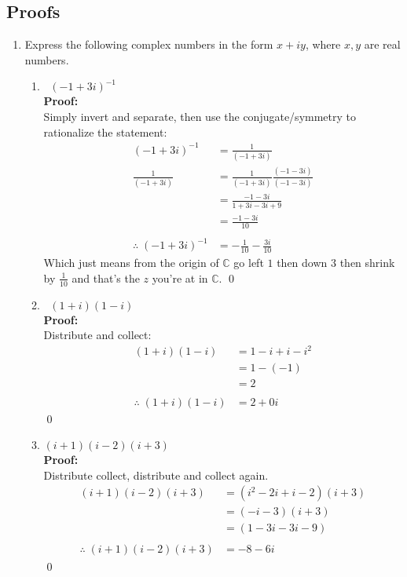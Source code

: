 \subsection{Proofs}
\begin{enumerate}
	\item Express the following complex numbers in the form $x + iy$, where $x, y$ are real numbers.
	\begin{enumerate}
		\item $\;\;(-1 + 3i)^{-1}$ \\
		
		\textbf{Proof:}	\\
		Simply invert and separate, then use the conjugate/symmetry to rationalize the statement:
		\begin{align*}
		(-1 + 3i)^{-1} &= \frac{1}{(-1 + 3i)} \\
		\frac{1}{(-1 + 3i)} &= \frac{1}{(-1 + 3i)}\frac{(-1 - 3i)}{(-1 - 3i)} \\
		&= \frac{-1 - 3i}{1 + 3i - 3i + 9} \\
		&= \frac{-1 - 3i}{10} \\
		\\
		\therefore \; (-1 + 3i)^{-1} &= -\frac{1}{10} - \frac{3i}{10}
		\end{align*}
		Which just means from the origin of $\mathbb{C}$ go left $1$ then down $3$ then shrink by $\frac{1}{10}$ and that's the $z$ you're at in $\mathbb{C}.$
		\qed
		
		\item $\;\;(1 + i)(1 - i)$ \\
		
		\textbf{Proof:} \\
		Distribute and collect:
		\begin{align*}
		(1 + i)(1 - i) &= 1 -i + i - i^2 \\
		&= 1 - (-1) \\
		&= 2 \\
		\\
		\therefore \; (1 + i)(1 - i) &= 2 + 0i
		\end{align*}
		\qed
		
		\item $(i + 1)(i - 2)(i + 3)$ \\
		
		\textbf{Proof:} \\
		Distribute collect, distribute and collect again.
		\begin{align*}
		(i + 1)(i - 2)(i + 3) &= (i^2 -2i + i - 2)(i + 3) \\
		&= (-i - 3)(i + 3) \\
		&= (1 - 3i - 3i - 9) \\
		\\
		\therefore \; (i + 1)(i - 2)(i + 3) &= -8 - 6i
		\end{align*}
		\qed
	\end{enumerate}
	

\end{enumerate}
